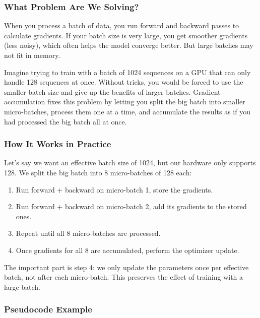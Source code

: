 \documentclass[
  letterpaper,
  DIV=11,
  numbers=noendperiod]{scrreprt}
\providecommand{\tightlist}{%
  \setlength{\itemsep}{0pt}\setlength{\parskip}{0pt}}
\begin{document}
\subsubsection{What Problem Are We
Solving?}\label{what-problem-are-we-solving}

When you process a batch of data, you run forward and backward passes to
calculate gradients. If your batch size is very large, you get smoother
gradients (less noisy), which often helps the model converge better. But
large batches may not fit in memory.

Imagine trying to train with a batch of 1024 sequences on a GPU that can
only handle 128 sequences at once. Without tricks, you would be forced
to use the smaller batch size and give up the benefits of larger
batches. Gradient accumulation fixes this problem by letting you split
the big batch into smaller micro-batches, process them one at a time,
and accumulate the results as if you had processed the big batch all at
once.

\subsubsection{How It Works in Practice}\label{how-it-works-in-practice}

Let's say we want an effective batch size of 1024, but our hardware only
supports 128. We split the big batch into 8 micro-batches of 128 each:

\begin{enumerate}
\def\labelenumi{\arabic{enumi}.}
\tightlist
\item
  Run forward + backward on micro-batch 1, store the gradients.
\item
  Run forward + backward on micro-batch 2, add its gradients to the
  stored ones.
\item
  Repeat until all 8 micro-batches are processed.
\item
  Once gradients for all 8 are accumulated, perform the optimizer
  update.
\end{enumerate}

The important part is step 4: we only update the parameters once per
effective batch, not after each micro-batch. This preserves the effect
of training with a large batch.

\subsubsection{Pseudocode Example}\label{pseudocode-example}
\end{document}
